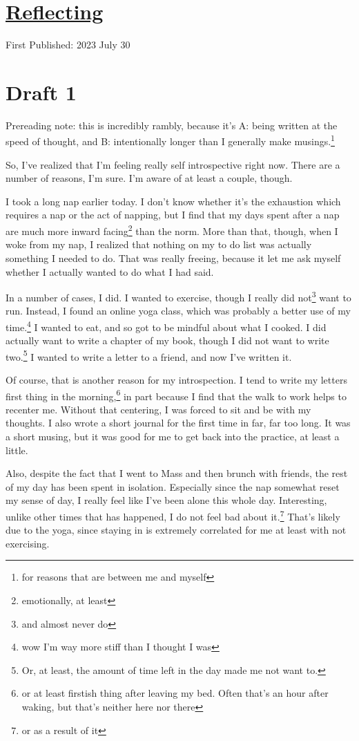 \documentclass[12pt]{article}[titlepage]
\renewcommand{\,}{\textsuperscript{,}}
\begin{document}
\doublespacing
\section{\href{reflection.html}{Reflecting}}
First Published: 2023 July 30


\section{Draft 1}
Prereading note: this is incredibly rambly, because it's A: being written at the speed of thought, and B: intentionally longer than I generally make musings.\footnote{for reasons that are between me and myself}

So, I've realized that I'm feeling really self introspective right now.
There are a number of reasons, I'm sure.
I'm aware of at least a couple, though.

I took a long nap earlier today.
I don't know whether it's the exhaustion which requires a nap or the act of napping, but I find that my days spent after a nap are much more inward facing\footnote{emotionally, at least} than the norm.
More than that, though, when I woke from my nap, I realized that nothing on my to do list was actually something I needed to do.
That was really freeing, because it let me ask myself whether I actually wanted to do what I had said.

In a number of cases, I did.
I wanted to exercise, though I really did not\footnote{and almost never do} want to run.
Instead, I found an online yoga class, which was probably a better use of my time.\footnote{wow I'm way more stiff than I thought I was}
I wanted to eat, and so got to be mindful about what I cooked.
I did actually want to write a chapter of my book, though I did not want to write two.\footnote{Or, at least, the amount of time left in the day made me not want to.}
I wanted to write a letter to a friend, and now I've written it.

Of course, that is another reason for my introspection.
I tend to write my letters first thing in the morning,\footnote{or at least firstish thing after leaving my bed. Often that's an hour after waking, but that's neither here nor there} in part because I find that the walk to work helps to recenter me.
Without that centering, I was forced to sit and be with my thoughts.
I also wrote a short journal for the first time in far, far too long.
It was a short musing, but it was good for me to get back into the practice, at least a little.

Also, despite the fact that I went to Mass and then brunch with friends, the rest of my day has been spent in isolation.
Especially since the nap somewhat reset my sense of day, I really feel like I've been alone this whole day.
Interesting, unlike other times that has happened, I do not feel bad about it.\footnote{or as a result of it}
That's likely due to the yoga, since staying in is extremely correlated for me at least with not exercising.
\end{document}
